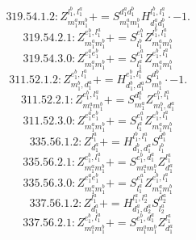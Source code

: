 \documentclass[letterpaper,10pt,fleqn,leqno,onecolumn]{article}
\begin{document}
\begin{equation} \;\;\;\;\;\;  319.54.1.2: Z^{l_{1}^{b},l_{1}^{a}}_{m_{1}^{a}m_{1}^{b}}+=S^{d_{1}^{a}d_{1}^{b}}_{m_{1}^{a}m_{1}^{b}}H^{l_{1}^{b},l_{1}^{a}}_{d_{1}^{a}d_{1}^{b}}\cdot -1. \end{equation}
\begin{equation} \;\;\;\;\;\;  319.54.2.1: Z^{e_{1}^{b},l_{1}^{a}}_{m_{1}^{a}m_{1}^{b}}+=S^{e_{1}^{b}}_{l_{1}^{b}}Z^{l_{1}^{b},l_{1}^{a}}_{m_{1}^{a}m_{1}^{b}} \end{equation}
\begin{equation} \;\;\;\;\;\;  319.54.3.0: Z^{e_{1}^{a}e_{1}^{b}}_{m_{1}^{a}m_{1}^{b}}+=S^{e_{1}^{a}}_{l_{1}^{a}}Z^{e_{1}^{b},l_{1}^{a}}_{m_{1}^{a}m_{1}^{b}} \end{equation}
\begin{equation} \;\;\;\;\;\;  311.52.1.2: Z^{e_{1}^{b},l_{1}^{a}}_{m_{1}^{b},d_{1}^{a}}+=H^{e_{1}^{b},l_{1}^{a}}_{d_{1}^{b},d_{1}^{a}}S^{d_{1}^{b}}_{m_{1}^{b}}\cdot -1. \end{equation}
\begin{equation} \;\;\;\;\;\;  311.52.2.1: Z^{e_{1}^{b},l_{1}^{a}}_{m_{1}^{a}m_{1}^{b}}+=S^{d_{1}^{a}}_{m_{1}^{a}}Z^{e_{1}^{b},l_{1}^{a}}_{m_{1}^{b},d_{1}^{a}} \end{equation}
\begin{equation} \;\;\;\;\;\;  311.52.3.0: Z^{e_{1}^{a}e_{1}^{b}}_{m_{1}^{a}m_{1}^{b}}+=S^{e_{1}^{a}}_{l_{1}^{a}}Z^{e_{1}^{b},l_{1}^{a}}_{m_{1}^{a}m_{1}^{b}} \end{equation}
\begin{equation} \;\;\;\;\;\;  335.56.1.2: Z^{l_{1}^{a}}_{d_{1}^{a}}+=H^{l_{1}^{b},l_{1}^{a}}_{d_{1}^{b},d_{1}^{a}}S^{d_{1}^{b}}_{l_{1}^{b}} \end{equation}
\begin{equation} \;\;\;\;\;\;  335.56.2.1: Z^{e_{1}^{b},l_{1}^{a}}_{m_{1}^{a}m_{1}^{b}}+=S^{e_{1}^{b},d_{1}^{a}}_{m_{1}^{a}m_{1}^{b}}Z^{l_{1}^{a}}_{d_{1}^{a}} \end{equation}
\begin{equation} \;\;\;\;\;\;  335.56.3.0: Z^{e_{1}^{a}e_{1}^{b}}_{m_{1}^{a}m_{1}^{b}}+=S^{e_{1}^{a}}_{l_{1}^{a}}Z^{e_{1}^{b},l_{1}^{a}}_{m_{1}^{a}m_{1}^{b}} \end{equation}
\begin{equation} \;\;\;\;\;\;  337.56.1.2: Z^{l_{1}^{a}}_{d_{1}^{a}}+=H^{l_{1}^{a},l_{2}^{a}}_{d_{1}^{a},d_{2}^{a}}S^{d_{2}^{a}}_{l_{2}^{a}} \end{equation}
\begin{equation} \;\;\;\;\;\;  337.56.2.1: Z^{e_{1}^{b},l_{1}^{a}}_{m_{1}^{a}m_{1}^{b}}+=S^{e_{1}^{b},d_{1}^{a}}_{m_{1}^{a}m_{1}^{b}}Z^{l_{1}^{a}}_{d_{1}^{a}} \end{equation}
\end{document}
